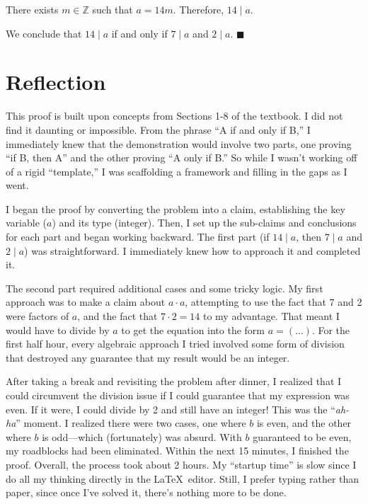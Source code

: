 \documentclass[9pt]{article}
\begin{document}
There exists $m\in\mathbb{Z}$ such that $a=14m$. Therefore, $14\mid a$.
\newline

\noindent We conclude that $14\mid a$ if and only if $7\mid a$ and $2\mid a$.$\,\,\blacksquare$
\section*{Reflection}
This proof is built upon concepts from Sections 1-8 of the textbook. I did not find it daunting or impossible. From the phrase ``A if and only if B,'' I immediately knew that the demonstration would involve two parts, one proving ``if B, then A'' and the other proving ``A only if B.'' So while I wasn't working off of a rigid ``template,'' I was scaffolding a framework and filling in the gaps as I went.

I began the proof by converting the problem into a claim, establishing the key variable ($a$) and its type (integer). Then, I set up the sub-claims and conclusions for each part and began working backward. The first part (if $14\mid a$, then $7\mid a$ and $2\mid a$) was straightforward. I immediately knew how to approach it and completed it.

The second part required additional cases and some tricky logic. My first approach was to make a claim about $a\cdot a$, attempting to use the fact that 7 and 2 were factors of $a$, and the fact that $7\cdot 2=14$ to my advantage. That meant I would have to divide by $a$ to get the equation into the form $a=(\dots)$. For the first half hour, every algebraic approach I tried involved some form of division that destroyed any guarantee that my result would be an integer.  

After taking a break and revisiting the problem after dinner, I realized that I could circumvent the division issue if I could guarantee that my expression was even. If it were, I could divide by 2 and still have an integer! This was the ``\textit{ah-ha}'' moment. I realized there were two cases, one where $b$ is even, and the other where $b$ is odd---which (fortunately) was absurd. With $b$ guaranteed to be even, my roadblocks had been eliminated. Within the next 15 minutes, I finished the proof. Overall, the process took about 2 hours. My ``startup time'' is slow since I do all my thinking directly in the \LaTeX\, editor. Still, I prefer typing rather than paper, since once I've solved it, there's nothing more to be done.
\end{document}
